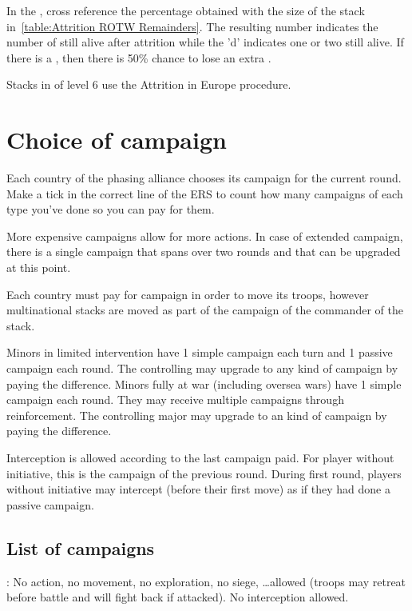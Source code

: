 \smallskip

In the \ROTW, cross reference the percentage obtained with the size of the
stack in~\ref{table:Attrition ROTW Remainders}. The resulting number indicates
the number of \LD still alive after attrition while the 'd' indicates one or
two \LDE still alive. If there is a \textetoile, then there is 50\% chance to
lose an extra \LDE.

Stacks in \COL of level 6 use the Attrition in Europe procedure.


\section{Choice of campaign}
\label{chMilitary:Choice of campaign}
Each country of the phasing alliance chooses its campaign for the current
round. Make a tick in the correct line of the ERS to count how many campaigns
of each type you've done so you can pay for them.

More expensive campaigns allow for more actions. In case of extended campaign,
there is a single campaign that spans over two rounds and that can be upgraded
at this point.

Each country must pay for campaign in order to move its troops, however
multinational stacks are moved as part of the campaign of the commander of the
stack.

\bparag Minors in limited intervention have 1 simple campaign each turn and 1
passive campaign each round. The controlling \MAJ may upgrade to any kind of
campaign by paying the difference.
\bparag Minors fully at war (including oversea wars) have 1 simple campaign
each round. They may receive multiple campaigns through reinforcement. The
controlling major may upgrade to an kind of campaign by paying the
difference.

 Interception is allowed according to the
last campaign paid.
\bparag For player without initiative, this is the campaign of the previous
round.
\bparag During first round, players without initiative may intercept (before
their first move) as if they had done a passive campaign.

\subsection{List of campaigns}
\ducats: No action, no movement, no exploration, no siege,
\ldots allowed (troops may retreat before battle and will fight back if
attacked). No interception allowed.

